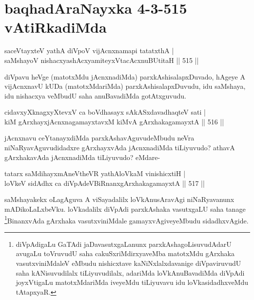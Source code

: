 \section*{baqhadAraNayxka 4-3-515 vAtiRkadiMda}


\begin{shl}
saceVtayxteV yathA diVpoV vijAcnxnamapi tatatxthA | \\
saMshayoV nishacxyashAcxyamiteyxVtacAcxnuBUtitaH \hfill||  515 ||  
\end{shl}

\begin{artha}
diVpavu heVge (matotxMdu jAcnxnadiMda) parxkAshisalapxDuvado, hAgeye A vijAcnxnavU kUDa (matotxMdariMda) parxkAshisalapxDuvudu, idu saMshaya, idu nishacxya veMbudU saha anuBavadiMda gotAtxguvudu.
\end{artha}


\begin{shl}
cidavxyXknagxyXtevxV ca boVdhasayx sAkASxdavadhaqteV sati | \\
kiM gArxhayxjAcnxnagamayxtavxM kiMvA gArxhakagamayxtA \hfill||  516 ||
\end{shl}

\begin{artha}
jAcnxnavu ceYtanayxdiMda parxkAshavAguvudeMbudu neVra niNaRyavAguvudidadxre gArxhayxvAda jAcnxnadiMda tiLiyuvudo? athavA gArxhakavAda jAcnxnadiMda tiLiyuvudo? eMdare-
\end{artha}

\begin{shl}
tatarx saMdihayxmAneV\s theVR yathAloVkaM vinishicxtiH | \\
loVkeV sidAdhx ca diVpAdeVBiRnanxgArxhakagamayxtA \hfill||  517 ||  
\end{shl}

\begin{artha}
saMshayakekx oLagAguva A viSayadalilx loVkAnusAravAgi niNaRyavanunx mADikoLaLxbeVku. loVkadalilx diVpAdi parxkAshaka vasutxgaLU saha tanage \footnote{diVpAdigaLu GaTAdi jaDavasutxgaLanunx parxkAshagoLisuvudAdarU avugaLu toVruvudU saha cakuSxriMdirxyaveMba matotxMdu gArxhaka vasutxviniMdaleV eMbudu nishicxtave kaNiNxlalxdavanige diVpaviruvudU saha kANisuvudilalx tiLiyuvudilalx, adariMda loVkAnuBavadiMda diVpAdi joyxVtigaLu matotxMdariMda iveyeMdu tiLiyuvavu idu loVkasidadhxveMdu tAtapxyaR.}BinanxvAda gArxhaka vasutxviniMdale gamayxvAgiveyeMbudu sidadhxvAgide.
\end{artha}

